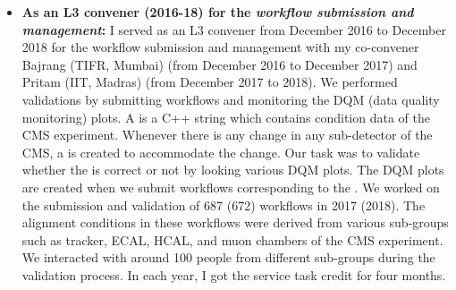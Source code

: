 \begin{itemize}[leftmargin=*]
{\begin{itemize}[leftmargin=*]
\item {\textbf{As an L3 convener (2016-18) for the \textit{workflow submission and 
management}:}
I served as an L3 convener from December 2016 to December 2018 for the workflow 
submission and management with my co-convener Bajrang (TIFR, Mumbai) (from December 2016 to 
December 2017) and Pritam (IIT, Madras) (from December 2017 to 2018). We performed  
validations by submitting workflows and monitoring the DQM (data quality 
monitoring) plots. A  is a C++ string which contains condition data of the 
CMS experiment. Whenever there is any change in any sub-detector of the CMS, a 
 is created to accommodate the change. Our task was to validate whether the 
is correct or not by looking various DQM plots. The DQM plots are created when 
we submit workflows corresponding to the . We worked on the submission  
and validation of 687 (672) workflows in 2017 (2018). The alignment conditions in 
these workflows were derived from various sub-groups such as tracker, ECAL, HCAL, 
and muon chambers of the CMS experiment. We interacted with around 100 people from 
different sub-groups during the validation process. In each year, I got the service task credit for
four months.

}
\end{itemize}}
\end{itemize}
